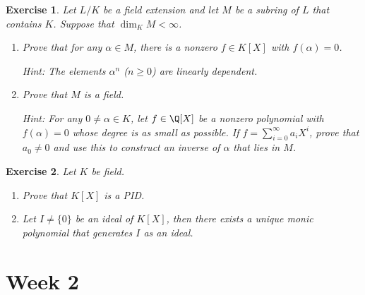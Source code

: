 \documentclass[a4paper,10pt,reqno]{amsart}
\newtheorem{ex}{Exercise}[section]
\begin{document}
\begin{ex}
    Let $L/K$ be a field extension and let $M$ be a subring of $L$ that contains $K$. Suppose that $\dim_KM < \infty$.
    \begin{enumerate}[label=(\roman*)]
        \item Prove that for any $\alpha \in M$, there is a nonzero $f \in K[X]$ with $f(\alpha) = 0$.

        \noindent \textit{Hint:} The elements $\alpha^n$ ($n \geq 0$) are linearly dependent.
        
        \item Prove that $M$ is a field.
        
        \noindent \textit{Hint:} For any $0 \neq \alpha \in K$, let $f \in \Q[X]$ be a nonzero polynomial with $f(\alpha) = 0$ whose degree is as small as possible. If $f = \sum_{i=0}^{\infty} a_iX^i$, prove that $a_0 \neq 0$ and use this to construct an inverse of $\alpha$ that lies in $M$.
    \end{enumerate}
\end{ex}

\begin{ex}
Let $K$ be field.
\begin{enumerate}[label=(\roman*)]
    \item Prove that $K[X]$ is a PID.
    \item Let $I\neq \{0\}$ be an ideal of $K[X]$, then there exists a unique monic polynomial that generates $I$ as an ideal.
\end{enumerate}
    
\end{ex}
\newpage
\section{Week 2}
\end{document}
